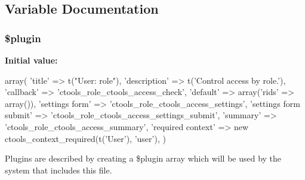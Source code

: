 \subsection{Variable Documentation}
\hypertarget{role_8inc_ada8a7130088351710bb02ed622d6bf65}{
\subsubsection[{\$plugin}]{\setlength{\rightskip}{0pt plus 5cm}\$plugin}}
\label{role_8inc_ada8a7130088351710bb02ed622d6bf65}
{\bfseries Initial value:}
\begin{DoxyCode}
 array(
  'title' => t("User: role"),
  'description' => t('Control access by role.'),
  'callback' => 'ctools_role_ctools_access_check',
  'default' => array('rids' => array()),
  'settings form' => 'ctools_role_ctools_access_settings',
  'settings form submit' => 'ctools_role_ctools_access_settings_submit',
  'summary' => 'ctools_role_ctools_access_summary',
  'required context' => new ctools_context_required(t('User'), 'user'),
)
\end{DoxyCode}
Plugins are described by creating a \$plugin array which will be used by the system that includes this file. 